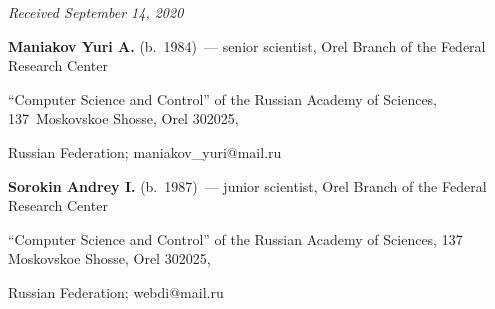 


\hfill{\small\textit{Received September 14, 2020}} 






\Contr



\noindent

\textbf{Maniakov Yuri A.} (b.\ 1984)~--- senior scientist, Orel Branch of the Federal Research Center 

``Computer Science and Control'' of the Russian Academy of Sciences, 137~Moskovskoe Shosse, Orel 302025, 

Russian Federation; \mbox{maniakov\_yuri@mail.ru}



\vspace*{5pt}







\noindent

\textbf{Sorokin Andrey I.} (b.\ 1987)~--- junior scientist, Orel Branch of the Federal Research Center 

``Computer Science and Control'' of the Russian Academy of Sciences, 137 Moskovskoe Shosse, Orel 302025, 

Russian Federation; \mbox{webdi@mail.ru}



\label{end\stat}



\renewcommand{\bibname}{\protect\rm Литература} 

